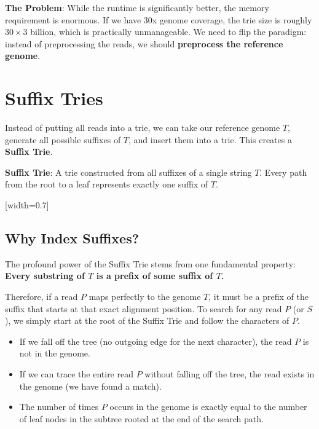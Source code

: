 \textbf{The Problem}: While the runtime is significantly better, the memory requirement is enormous. If we have 30x genome coverage, the trie size is roughly $30 \times 3$ billion, which is practically unmanageable. We need to flip the paradigm: instead of preprocessing the reads, we should \textbf{preprocess the reference genome}.

\section{Suffix Tries}

Instead of putting all reads into a trie, we can take our reference genome \(T\), generate all possible suffixes of \(T\), and insert them into a trie. This creates a \textbf{Suffix Trie}.

\begin{important}
    \textbf{Suffix Trie}: A trie constructed from all suffixes of a single string \(T\). Every path from the root to a leaf represents exactly one suffix of \(T\).
\end{important}


[width=0.7\textwidth]

\subsection{Why Index Suffixes?}

The profound power of the Suffix Trie stems from one fundamental property:\\
\sta \textbf{Every substring of \(T\) is a prefix of some suffix of \(T\).}

Therefore, if a read \(P\) maps perfectly to the genome \(T\), it must be a prefix of the suffix that starts at that exact alignment position. To search for any read \(P\) (or $S$), we simply start at the root of the Suffix Trie and follow the characters of \(P\).
\begin{itemize}
    \item If we fall off the tree (no outgoing edge for the next character), the read \(P\) is not in the genome.
    \item If we can trace the entire read \(P\) without falling off the tree, the read exists in the genome (we have found a match).
    \item The number of times \(P\) occurs in the genome is exactly equal to the number of leaf nodes in the subtree rooted at the end of the search path.
\end{itemize}

